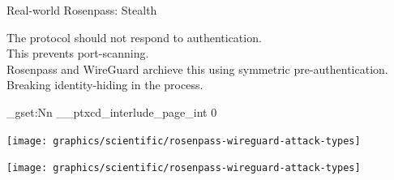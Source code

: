 \begin{frame}{Real-world Rosenpass: Stealth}
  \begin{minipage}{.5\pagewidth}
    \centering
    The protocol should not respond to authentication.
    \\[1.3em] This prevents port-scanning.
    \\[1.3em] Rosenpass and WireGuard archieve this using symmetric pre-authentication.
    \\[1.3em] Breaking identity-hiding in the process.
  \end{minipage}
\end{frame}

\ExplSyntaxOn
\int_gset:Nn \g__ptxcd_interlude_page_int {0}
\ExplSyntaxOff
{}

\SetNextBackground{}
\begin{frame}{}
  \centering
  \texttt{[image: graphics/scientific/rosenpass-wireguard-attack-types]}
\end{frame}

\SetNextBackground{}
\begin{frame}{}
  \centering
  \texttt{[image: graphics/scientific/rosenpass-wireguard-attack-types]}
\end{frame}
